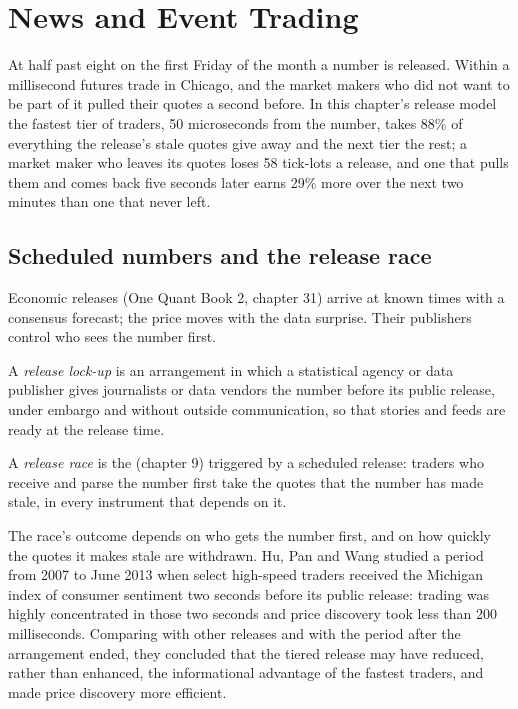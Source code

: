 \chapter{News and Event Trading}\label{ch:hf:news-and-event-trading}

At half past eight on the first Friday of the month a number is released. Within a millisecond futures trade in Chicago, and the market makers
who did not want to be part of it pulled their quotes a second before. In this chapter's release model the fastest tier of traders, 50
microseconds from the number, takes 88\% of everything the release's stale quotes give away and the next tier the rest; a market maker who leaves
its quotes loses 58 tick-lots a release, and one that pulls them and comes back five seconds later earns 29\% more over the next two minutes than
one that never left.

\section{Scheduled numbers and the release race}

Economic releases (One Quant Book 2, chapter 31) arrive at known times with a consensus forecast; the price moves with the data surprise. Their
publishers control who sees the number first.

\begin{definition}\label{def:hf:news-and-event-trading:lockup}
A \emph{release lock-up} is an arrangement in which a statistical agency or data publisher gives journalists or data
vendors the number before its public release, under embargo and without outside communication, so that stories and feeds are ready at the release
time.
\end{definition}

\begin{definition}\label{def:hf:news-and-event-trading:race}
A \emph{release race} is the  (chapter 9) triggered by a scheduled release: traders who receive and parse the
number first take the quotes that the number has made stale, in every instrument that depends on it.
\end{definition}

The race's outcome depends on who gets the number first, and on how quickly the quotes it makes stale are withdrawn. Hu, Pan and Wang studied a
period from 2007 to June 2013 when select high-speed traders received the Michigan index of consumer sentiment two seconds before its public release:
trading was highly concentrated in those two seconds and price discovery took less than 200 milliseconds. Comparing with other releases and with
the period after the arrangement ended, they concluded that the tiered release may have reduced, rather than enhanced, the informational
advantage of the fastest traders, and made price discovery more efficient.

